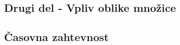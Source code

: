 \documentclass{article}
\begin{document}
\subsection{Drugi del - Vpliv oblike množice}

\subsection{Časovna zahtevnost}
\end{document}

